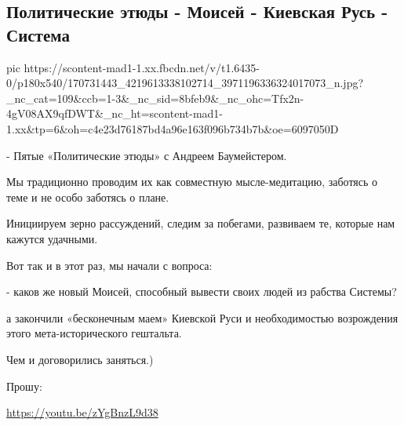  
 
 
 
 
\subsection{Политические этюды - Моисей - Киевская Русь - Система}

\ifcmt
  pic https://scontent-mad1-1.xx.fbcdn.net/v/t1.6435-0/p180x540/170731443_4219613338102714_3971196336324017073_n.jpg?_nc_cat=109&ccb=1-3&_nc_sid=8bfeb9&_nc_ohc=Tfx2n-4gV08AX9qfDWT&_nc_ht=scontent-mad1-1.xx&tp=6&oh=c4e23d76187bd4a96e163f096b734b7b&oe=6097050D
\fi

- Пятые «Политические этюды» с Андреем Баумейстером.

Мы традиционно проводим их как совместную мысле-медитацию, заботясь о теме и не особо заботясь о плане.

Инициируем зерно рассуждений, следим за побегами, развиваем те, которые нам кажутся удачными.

Вот так и в этот раз, мы начали с вопроса:

- каков же новый Моисей, способный вывести своих людей из рабства Системы?

а закончили «бесконечным маем» Киевской Руси и необходимостью возрождения этого
мета-исторического гештальта.

Чем и договорились заняться.)

Прошу:

\url{https://youtu.be/zYgBnzL9d38}
